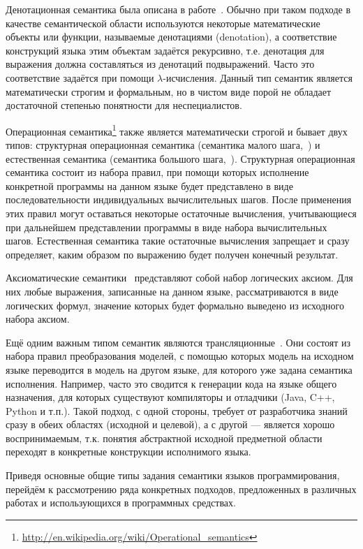 \documentclass[a5paper]{article}
\begin{document}
Денотационная семантика была описана в работе~\cite{semantics2}. Обычно при таком подходе в качестве семантической области используются некоторые математические объекты или функции, называемые денотациями (denotation), а соответствие конструкций языка этим объектам задаётся рекурсивно, т.е. денотация для выражения должна составляться из денотаций подвыражений. Часто это соответствие задаётся при помощи $\lambda$-исчисления. Данный тип семантик является математически строгим и формальным, но в чистом виде порой не обладает достаточной степенью понятности для неспециалистов.

Операционная семантика\footnote{\url{http://en.wikipedia.org/wiki/Operational_semantics}} также является математически строгой и бывает двух типов: структурная операционная семантика (семантика малого шага,~\cite{semantics1}) и естественная семантика (семантика большого шага,~\cite{plotkin}).  Структурная операционная семантика состоит из набора правил, при помощи которых исполнение конкретной программы на данном языке будет представлено в виде последовательности индивидуальных вычислительных шагов. После применения этих правил могут оставаться некоторые остаточные вычисления, учитывающиеся при дальнейшем представлении программы в виде набора вычислительных шагов. Естественная семантика такие остаточные вычисления запрещает и сразу определяет, каким образом по выражению будет получен конечный результат.

Аксиоматические семантики~\cite{hoare} представляют собой набор логических аксиом. Для них любые выражения, записанные на данном языке, рассматриваются в виде логических формул, значение которых будет формально выведено из исходного набора аксиом.

Ещё одним важным типом семантик являются трансляционные~\cite{translational}. Они состоят из набора правил преобразования моделей, с помощью которых модель на исходном языке переводится в модель на другом языке, для которого уже задана семантика исполнения. Например, часто это сводится к генерации кода на языке общего назначения, для которых существуют компиляторы и отладчики (Java, C++, Python и т.п.). Такой подход, с одной стороны, требует от разработчика знаний сразу в обеих областях (исходной и целевой), а с другой — является хорошо воспринимаемым, т.к. понятия абстрактной исходной предметной области переходят в конкретные конструкции исполнимого языка.

Приведя основные общие типы задания семантики языков программирования, перейдём к рассмотрению ряда конкретных подходов, предложенных в различных работах и использующихся в программных средствах.
\end{document}
